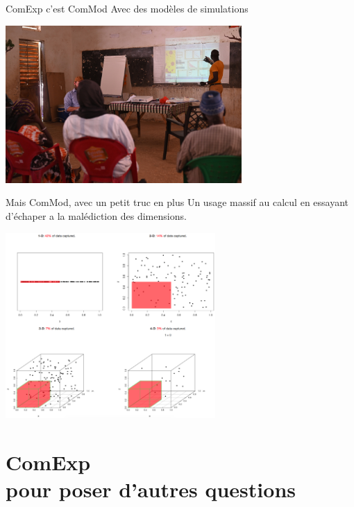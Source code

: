 \documentclass[newPxFont]{beamer}
\begin{document}
\begin{frame}[c]{ComExp c'est ComMod}
  \vspace{-1cm}
  Avec des modèles de simulations
  \begin{center}
  \includegraphics[width=9cm]{img/modelSimu.JPG}
  \end{center}
\end{frame}

\begin{frame}[c]{Mais ComMod, avec un petit truc en plus}
  \vspace{-1cm}
  \small Un usage massif au calcul en essayant d'échaper a la malédiction des dimensions.
\begin{center}
 \includegraphics[width=8cm]{img/CurseOfDimensionality.png}
\end{center}
\end{frame}



\section{ComExp\\ pour poser d'autres questions}
\end{document}
